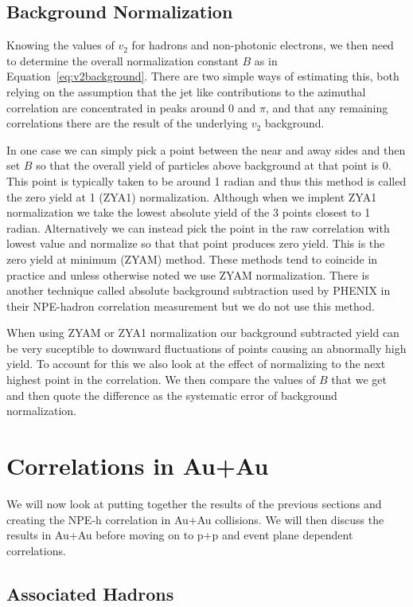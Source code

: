 \subsection{Background Normalization}

Knowing the values of $v_2$ for hadrons and non-photonic electrons, we then need to determine the overall normalization constant $B$ as in Equation~\ref{eq:v2background}. There are two simple ways of estimating this, both relying on the assumption that the jet like contributions to the azimuthal correlation are concentrated in peaks around 0 and $\pi$, and that any remaining correlations there are the result of the underlying $v_2$ background. 

In one case we can simply pick a point between the near and away sides and then set $B$ so that the overall yield of particles above background at that point is 0. This point is typically taken to be around 1 radian and thus this method is called the zero yield at 1 (ZYA1) normalization. Although when we implent ZYA1 normalization we take the lowest absolute yield of the 3 points closest to 1 radian. Alternatively we can instead pick the point in the raw correlation with lowest value and normalize so that that point produces zero yield. This is the zero yield at minimum (ZYAM) method. These methods tend to coincide in practice and unless otherwise noted we use ZYAM normalization. There is another technique called absolute background subtraction used by PHENIX in their NPE-hadron correlation measurement but we do not use this method. 

When using ZYAM or ZYA1 normalization our background subtracted yield can be very suceptible to downward fluctuations of points causing an abnormally high yield. To account for this we also look at the effect of normalizing to the next highest point in the correlation. We then compare the values of $B$ that we get and then quote the difference as the systematic error of background normalization.

\section{Correlations in Au+Au}

We will now look at putting together the results of the previous sections and creating the NPE-h correlation in Au+Au collisions. We will then discuss the results in Au+Au before moving on to p+p and event plane dependent correlations.

\subsection{Associated Hadrons}


